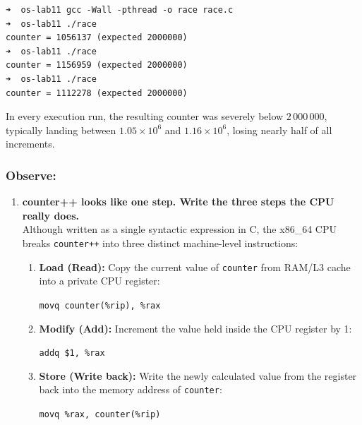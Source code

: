 \documentclass{labreport}
\begin{document}
\begin{lstlisting}[style=bash]
➜  os-lab11 gcc -Wall -pthread -o race race.c
➜  os-lab11 ./race
counter = 1056137 (expected 2000000)
➜  os-lab11 ./race
counter = 1156959 (expected 2000000)
➜  os-lab11 ./race
counter = 1112278 (expected 2000000)
\end{lstlisting}

In every execution run, the resulting counter was severely below $2\,000\,000$, typically landing between $1.05 \times 10^6$ and $1.16 \times 10^6$, losing nearly half of all increments.

\subsubsection*{Observe:}
\begin{enumerate}[leftmargin=*]
    \item \textbf{counter++ looks like one step. Write the three steps the CPU really does.}\\[0.2em]
    Although written as a single syntactic expression in C, the x86\_64 CPU breaks \texttt{counter++} into three distinct machine-level instructions:
    \begin{enumerate}[label=(\roman*), noitemsep]
        \item \textbf{Load (Read):} Copy the current value of \texttt{counter} from RAM/L3 cache into a private CPU register:
        \begin{center}
            \texttt{movq counter(\%rip), \%rax}
        \end{center}
        \item \textbf{Modify (Add):} Increment the value held inside the CPU register by 1:
        \begin{center}
            \texttt{addq \$1, \%rax}
        \end{center}
        \item \textbf{Store (Write back):} Write the newly calculated value from the register back into the memory address of \texttt{counter}:
        \begin{center}
            \texttt{movq \%rax, counter(\%rip)}
        \end{center}
    \end{enumerate}


\end{enumerate}
\end{document}

